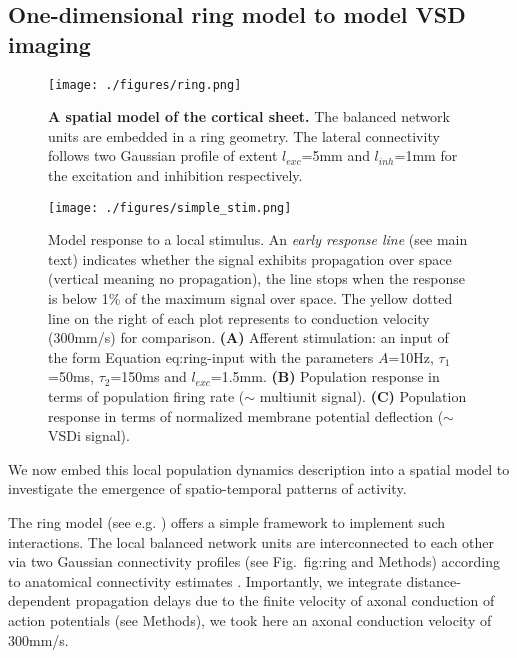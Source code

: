 \documentclass[8pt, colorlinks, a4paper]{article}
\renewcommand\ref{}
\newcommand{\corr}[1]{{#1}}
\begin{document}
\subsection{\corr{One-dimensional ring model to model VSD imaging}}
\label{sec-4-8}

\begin{figure}[tb!]
\centering
\texttt{[image: ./figures/ring.png]}

\caption{\label{fig:ring}\corr{\textbf{A spatial model of the cortical
      sheet.} The balanced network units are embedded in a ring
    geometry. The lateral connectivity follows two Gaussian profile of
    extent \(l_{exc}\)=5mm and \(l_{inh}\)=1mm for the excitation and
    inhibition respectively.}}

\end{figure}

\begin{figure*}
\centering
\texttt{[image: ./figures/simple\_stim.png]}

\caption{\label{fig:simple-stim}\corr{Model response to a local
    stimulus. An \emph{early response line} (see main text) indicates
    whether the signal exhibits propagation over space (vertical
    meaning no propagation), the line stops when the response is below
    1\% of the maximum signal over space. The yellow dotted line on
    the right of each plot represents to conduction velocity (300mm/s)
    for comparison. \textbf{(A)} Afferent stimulation: an input of the
    form Equation \ref{eq:ring-input} with the parameters \(A\)=10Hz,
    \(\tau_1\)=50ms, \(\tau_2\)=150ms and
    \(l_{exc}\)=1.5mm. \textbf{(B)} Population response in terms of
    population firing rate (\(\sim\) multiunit signal).  \textbf{(C)}
    Population response in terms of normalized membrane potential
    deflection (\(\sim\) VSDi signal).}}

\end{figure*}

\corr{We now embed this local population dynamics description into a
  spatial model to investigate the emergence of spatio-temporal
  patterns of activity.}

\corr{The ring model (see e.g. \cite{Hansel1996}) offers a simple
  framework to implement such interactions. The local balanced network
  units are interconnected to each other via two Gaussian connectivity
  profiles (see Fig.~\ref{fig:ring} and Methods) according to
  anatomical connectivity estimates \cite{Buzas2006}. Importantly, we
  integrate distance-dependent propagation delays due to the finite
  velocity of axonal conduction of action potentials (see Methods), we
  took here an axonal conduction velocity of 300mm/s.}
\end{document}
